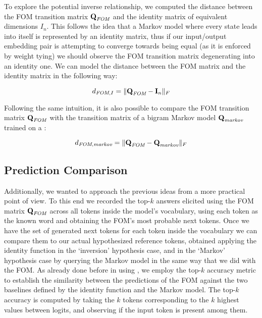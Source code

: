 To explore the potential inverse relationship, we computed the distance between the FOM transition matrix $\bm{\mathbf{Q}}_{\textit{FOM}}$ and the identity matrix of equivalent dimensions $I_n$.
This follows the idea that a Markov model where every state leads into itself is represented by an identity matrix, thus if our input/output embedding pair is attempting to converge towards being equal (as it is enforced by weight tying) we should observe the FOM transition matrix degenerating into an identity one.
We can model the distance between the FOM matrix and the identity matrix in the following way:

\begin{equation}
    \label{eq:method_fom_fom-i-comp}
    d_{\textit{FOM},I} = \| \bm{\mathbf{Q}}_{\textit{FOM}} - \bm{\mathbf{I}}_n \|_F
\end{equation}

Following the same intuition, it is also possible to compare the FOM transition matrix $\bm{\mathbf{Q}}_{\textit{FOM}}$ with the transition matrix of a bigram Markov model $\bm{\mathbf{Q}}_{\textit{markov}}$ trained on a :

\begin{equation}
    \label{eq:method_fom_fom-markov-comp}
    d_{\textit{FOM},\textit{markov}} = \| \bm{\mathbf{Q}}_{\textit{FOM}} - \bm{\mathbf{Q}}_{\textit{markov}} \|_F
\end{equation}

\subsection{Prediction Comparison}

Additionally, we wanted to approach the previous ideas from a more practical point of view.
To this end we recorded the top-$k$ answers elicited using the FOM matrix $\bm{\mathbf{Q}}_{\textit{FOM}}$ across all tokens inside the model's vocabulary, using each token as the known word and obtaining the FOM's most probable next tokens.
Once we have the set of generated next tokens for each token inside the vocabulary we can compare them to our actual hypothesized reference tokens, obtained applying the identity function in the `inversion' hypothesis case, and in the `Markov' hypothesis case by querying the Markov model in the same way that we did with the FOM.
As already done before in  using , we employ the top-$k$ accuracy metric to establish the similarity between the predictions of the FOM against the two baselines defined by the identity function and the Markov model.
The top-$k$ accuracy is computed by taking the $k$ tokens corresponding to the $k$ highest values between logits, and observing if the input token is present among them.
